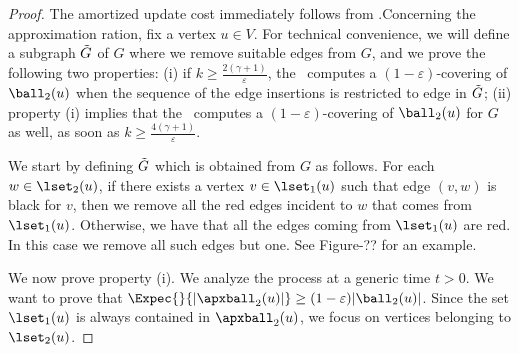\begin{proof}
The amortized update cost immediately follows from .Concerning the approximation ration, fix a vertex $u \in V$. For technical convenience, we will define a subgraph $\Tilde{G}$ of $G$ where we remove suitable edges from $G$, and we prove the following two properties: (i) if $k\ge \frac{2(\gamma+1)}{\varepsilon}$, the \lazyscheme\ computes a $(1-\varepsilon)$-covering of $\ball_2(u)$ when the sequence of the edge insertions is restricted to edge in $\Tilde{G}$; (ii) property (i) implies that the \lazyscheme\ computes a $(1-\varepsilon)$-covering of $\ball_2(u)$ for $G$ as well, as soon as $k\ge \frac{4(\gamma+1)}{\varepsilon}$.

We start by defining $\Tilde{G}$ which is obtained from $G$ as follows. For each $w \in \lset_2(u)$, if there exists a vertex $v \in \lset_1(u)$ such that edge $(v,w)$ is black for $v$, then we remove all the red edges incident to $w$ that comes from $\lset_1(u)$. Otherwise, we have that all the edges coming from $\lset_1(u)$ are red. In this case we remove all such edges but one. See Figure-?? for an example.

We now prove property (i). 
We analyze the process at a generic time $t>0$.
We want to prove that $\Expec{}{\vert \apxball_2(u) \vert} \ge (1-\varepsilon)\vert \ball_2(u) \vert$. Since the set $\lset_1(u)$ is always contained in  $\apxball_2(u)$, we focus on vertices belonging to $\lset_2(u)$.  


\end{proof}
